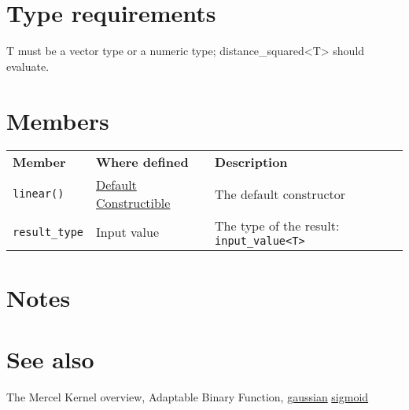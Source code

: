 \documentclass{article}
\begin{document}
\section*{Type requirements}

T must be a vector type or a numeric type; distance_squared<T> should evaluate.


\section*{Members}

\begin{tabular}{lll}
\textbf{Member} & \textbf{Where defined} & \textbf{Description} \\ 
\texttt{linear()} & \href{http://www.sgi.com/tech/stl/DefaultConstructible.html}{Default Constructible} & The default constructor \\
\texttt{result_type} & Input value & The type of the result: \texttt{input_value<T>} \\
\end{tabular}

\section*{Notes}

\section*{See also}

The Mercel Kernel overview, Adaptable Binary Function,
\href{research/kml/documentation/gaussian.html}{gaussian}
\href{research/kml/documentation/sigmoid.html}{sigmoid}



\end{document}
